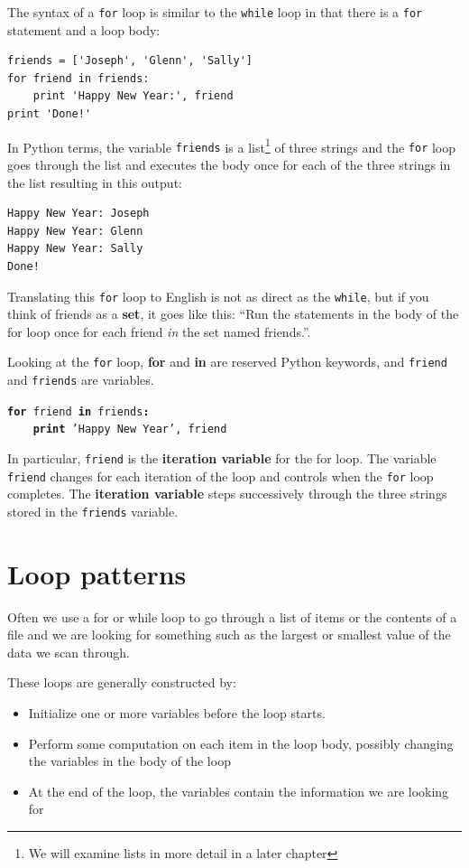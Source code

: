 \documentclass[10pt]{book}
\begin{document}
The syntax of a {\tt for} loop is similar to the {\tt while} loop
in that there is a {\tt for} statement and a loop body:

\beforeverb
\begin{verbatim}
friends = ['Joseph', 'Glenn', 'Sally']
for friend in friends:
    print 'Happy New Year:', friend
print 'Done!'
\end{verbatim}
\afterverb
%
In Python terms, 
the variable {\tt friends} is a list\footnote{We will 
examine lists in more detail in a later chapter} 
of three strings and the {\tt for}
loop goes through the list and executes the body once
for each of the three strings in the list resulting in this output:

\beforeverb
\begin{verbatim}
Happy New Year: Joseph
Happy New Year: Glenn
Happy New Year: Sally
Done!
\end{verbatim}
\afterverb
%

Translating this {\tt for} loop to English is not as direct as the 
{\tt while}, but if you think of friends as a {\bf set},
it goes like this: ``Run the statements in the body of the 
for loop once for each friend \emph{in} the set named friends.''.

Looking at the {\tt for} loop, {\bf for} and {\bf in} are reserved
Python keywords, and {\tt friend} and {\tt friends} are variables.

{\tt {\bf for} friend {\bf in} friends{\bf :}\\
\verb"    "{\bf print} 'Happy New Year', friend }

In particular, {\tt friend} is the {\bf iteration variable} for 
the for loop.  The variable {\tt friend} changes for each iteration of
the loop and controls when the {\tt for} loop completes.  The 
{\bf iteration variable} steps successively through the 
three strings stored in the {\tt friends} variable.


\section{Loop patterns}

Often we use a for or while loop to go through a list of items
or the contents of a file and we are looking for something such as
the largest or smallest value of the data we scan through.

These loops are generally constructed by:

\begin{itemize}

\item Initialize one or more variables before the loop starts.

\item Perform some computation on each item in the loop body, 
possibly changing the variables in the body of the loop

\item At the end of the loop, the variables contain the information
we are looking for

\end{itemize}
\end{document}
